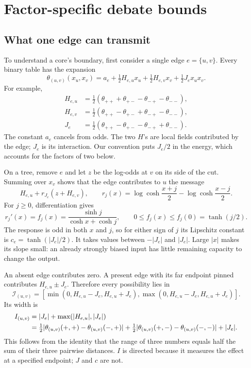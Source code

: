 \documentclass[11pt]{article}
\theoremstyle{definition}
\theoremstyle{remark}
\newcommand{\reach}{\mathcal I}
\begin{document}
\clearpage
\section{Factor-specific debate bounds}
\label{sec:factor}

\subsection{What one edge can transmit}
To understand a core's boundary, first consider a single edge $e=\{u,v\}$.
Every binary table has the expansion
\begin{equation}
 \theta_{(u,v)}(x_u,x_v)
 =a_e+\tfrac12 H_{e,u}x_u+\tfrac12 H_{e,v}x_v
                         +\tfrac12 J_e x_ux_v.
 \label{eq:contrast}
\end{equation}
For example,
\begin{align*}
 H_{e,u}&=\tfrac12(\theta_{++}+\theta_{+-}-\theta_{-+}-\theta_{--}),\\
 H_{e,v}&=\tfrac12(\theta_{++}-\theta_{+-}+\theta_{-+}-\theta_{--}),\\
 J_e&=\tfrac12(\theta_{++}-\theta_{+-}-\theta_{-+}+\theta_{--}).
\end{align*}
The constant $a_e$ cancels from odds. The two $H$'s are local fields
contributed by the edge; $J_e$ is its interaction. Our convention puts
$J_e/2$ in the energy, which accounts for the factors of two below.

On a tree, remove $e$ and let $z$ be the log-odds at $v$ on its side of
the cut. Summing over $x_v$ shows that the edge contributes to $u$ the message
\begin{equation}
 H_{e,u}+r_{J_e}(z+H_{e,v}),\qquad
 r_j(x)=\log\cosh\frac{x+j}{2}-\log\cosh\frac{x-j}{2}.
 \label{eq:message}
\end{equation}
For $j\ge0$, differentiation gives
\begin{equation}
 r_j'(x)=f_j(x)=\frac{\sinh j}{\cosh x+\cosh j},\qquad
 0\le f_j(x)\le f_j(0)=\tanh(j/2).
 \label{eq:slope}
\end{equation}
The response is odd in both $x$ and $j$, so for either sign of $j$ its
Lipschitz constant is $c_e=\tanh(|J_e|/2)$. It takes values between
$-|J_e|$ and $|J_e|$. Large $|x|$ makes its slope small: an already
strongly biased input has little remaining capacity to change the output.

An absent edge contributes zero. A present edge with its far endpoint
pinned contributes $H_{e,u}\pm J_e$. Therefore every possibility lies in
\[
 \reach_{(u,v)}=[\min(0,H_{e,u}-J_e,H_{e,u}+J_e),
                  \max(0,H_{e,u}-J_e,H_{e,u}+J_e)].
\]
Its width is
\begin{align}
 I_{(u,v)}
 &=|J_e|+\max(|H_{e,u}|,|J_e|)\notag\\
 &=\tfrac12|\theta_{(u,v)}(+,+)-\theta_{(u,v)}(-,+)|
  +\tfrac12|\theta_{(u,v)}(+,-)-\theta_{(u,v)}(-,-)|+|J_e|.
 \label{eq:reach}
\end{align}
This follows from the identity that the range of three numbers equals
half the sum of their three pairwise distances. $I$ is directed because
it measures the effect at a specified endpoint; $J$ and $c$ are not.
\end{document}
